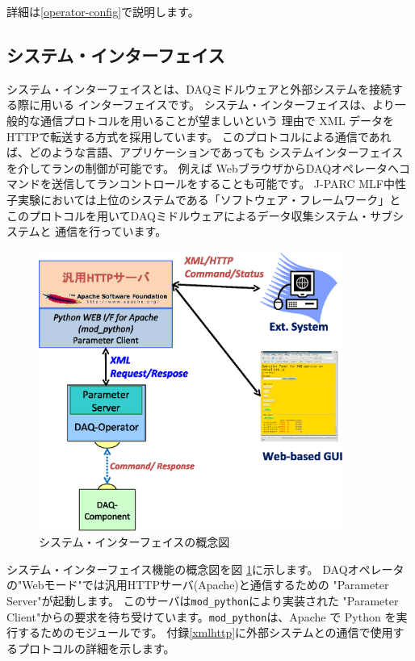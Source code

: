 \documentclass[a4j,10pt,dvips,onecolumn,oneside,final]{jarticle}%
\begin{document}
詳細は\ref{operator-config}で説明します。


\subsection{システム・インターフェイス}\label{sysint}
システム・インターフェイスとは、DAQミドルウェアと外部システムを接続する際に用いる
インターフェイスです。
システム・インターフェイスは、より一般的な通信プロトコルを用いることが望ましいという
理由で XML データをHTTPで転送する方式を採用しています。
このプロトコルによる通信であれば、どのような言語、アプリケーションであっても
システムインターフェイスを介してランの制御が可能です。
例えば WebブラウザからDAQオペレータへコマンドを送信してランコントロールをすることも可能です。
J-PARC MLF中性子実験においては上位のシステムである「ソフトウェア・フレームワーク」と
このプロトコルを用いてDAQミドルウェアによるデータ収集システム・サブシステムと
通信を行っています。
\begin{figure}[htbp]
  \begin{center}
   \includegraphics[width=100mm]{web-interface.eps}
  \end{center}
  \caption{システム・インターフェイスの概念図}
  \label{web-interface.fig}
\end{figure}

システム・インターフェイス機能の概念図を図 \ref{web-interface.fig}に示します。
DAQオペレータの"Webモード"では汎用HTTPサーバ(Apache)と通信するための
"Parameter Server"が起動します。
このサーバは\verb|mod_python|により実装された
"Parameter Client"からの要求を待ち受けています。\verb|mod_python|は、Apache で
Python を実行するためのモジュールです。
付録\ref{xmlhttp}に外部システムとの通信で使用するプロトコルの詳細を示します。
\end{document}
